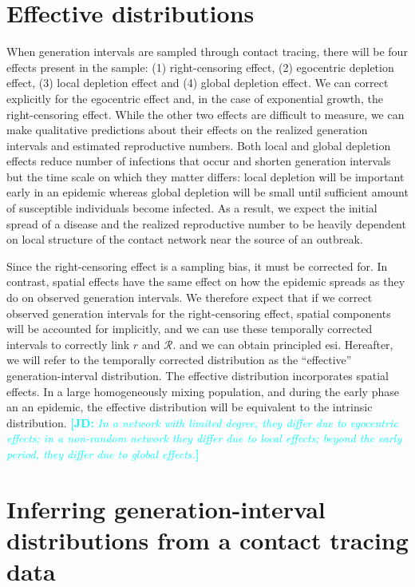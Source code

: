 \documentclass[12pt]{article}
\newcommand{\RR}{\ensuremath{{\mathcal R}}}
\newcommand{\comment}[3]{\textcolor{#1}{\textbf{[#2: }\textsl{#3}\textbf{]}}}
\newcommand{\jd}[1]{\comment{cyan}{JD}{#1}}
\begin{document}
\section{Effective distributions}

When generation intervals are sampled through contact tracing, there will be four effects present in the sample: (1) right-censoring effect, (2) egocentric depletion effect, (3) local depletion effect and (4) global depletion effect.
We can correct explicitly for the egocentric effect and, in the case of exponential growth, the right-censoring effect.
While the other two effects are difficult to measure, we can make qualitative predictions about their effects on the realized generation intervals and estimated reproductive numbers. 
Both local and global depletion effects reduce number of infections that occur and shorten generation intervals but the time scale on which they matter differs:
local depletion will be important early in an epidemic whereas global depletion will be small until sufficient amount of susceptible individuals become infected.
As a result, we expect the initial spread of a disease and the realized reproductive number to be heavily dependent on local structure of the contact network near the source of an outbreak.

Since the right-censoring effect is a sampling bias, it must be corrected for.
In contrast, spatial effects have the same effect on how the epidemic spreads as they do on observed generation intervals. 
We therefore expect that if we correct observed generation intervals for the right-censoring effect, spatial components will be accounted for implicitly, and we can use these temporally corrected intervals to correctly link $r$ and $\RR$. and we can obtain principled esi.
Hereafter, we will refer to the temporally corrected distribution as the ``effective'' generation-interval distribution. The effective distribution incorporates spatial effects. In a large homogeneously mixing population, and during the early phase an an epidemic, the effective distribution will be equivalent to the intrinsic distribution.
\jd{In a network with limited degree, they differ due to egocentric effects; in a non-random network they differ due to local effects; beyond the early period, they differ due to global effects.}

\section{Inferring generation-interval distributions from a contact tracing data}
\end{document}

